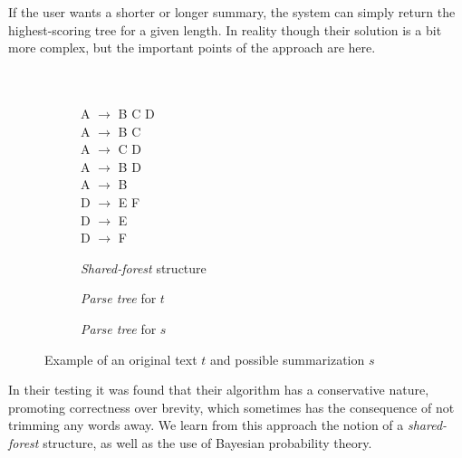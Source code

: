 If the user wants a shorter or longer summary, the system can simply return the highest-scoring tree for a given length. In reality though their solution is a bit more complex, but the important points of the approach are here.

\begin{figure}[H]
\begin{subfigure}{0.3\textwidth}
\quad \\
\quad \\
\phantom{\qquad}A $\rightarrow$ B C D \\
\phantom{\qquad}A $\rightarrow$ B C \\
\phantom{\qquad}A $\rightarrow$ C D \\
\phantom{\qquad}A $\rightarrow$ B D \\
\phantom{\qquad}A $\rightarrow$ B \\
\phantom{\qquad}D $\rightarrow$ E F \\
\phantom{\qquad}D $\rightarrow$ E \\
\phantom{\qquad}D $\rightarrow$ F \\
\caption{\textit{Shared-forest} structure}
\end{subfigure}
\begin{subfigure}{0.4\textwidth}
\centering
{}
\caption{\textit{Parse tree} for $t$}
\end{subfigure}
\begin{subfigure}{0.25\textwidth}
\centering
{}
\caption{\textit{Parse tree} for $s$}
\end{subfigure}
\caption{Example of an original text $t$ and possible summarization $s$}
\label{fig:statistics_example}
\end{figure}

\noindent
In their testing it was found that their algorithm has a conservative nature, promoting correctness over brevity, which sometimes has the consequence of not trimming any words away. We learn from this approach the notion of a \textit{shared-forest} structure, as well as the use of Bayesian probability theory.

